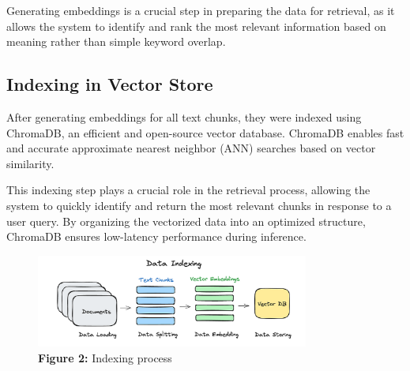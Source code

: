 Generating embeddings is a crucial step in preparing the data for retrieval, as it allows the system to identify and rank the most relevant information based on meaning rather than simple keyword overlap.

\subsection{Indexing in Vector Store}
\label{subsec:indexing}

After generating embeddings for all text chunks, they were indexed using ChromaDB, an efficient and open-source vector database. ChromaDB enables fast and accurate approximate nearest neighbor (ANN) searches based on vector similarity.

This indexing step plays a crucial role in the retrieval process, allowing the system to quickly identify and return the most relevant chunks in response to a user query. By organizing the vectorized data into an optimized structure, ChromaDB ensures low-latency performance during inference.

\begin{figure}[htbp]
  \centering
  \includegraphics[width=0.8\textwidth]{images/Indexing_RAG.png}
  \caption*{\textbf{Figure 2:} Indexing process} %
  \label{fig:indexing-process-manual}
\end{figure}

